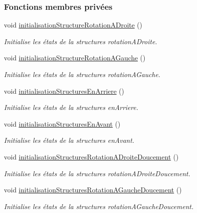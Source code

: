 \subsubsection*{Fonctions membres privées}
\begin{DoxyCompactItemize}
\item 
void \hyperlink{class_manette_a34e37141425dd6d62bcb5954312705c9}{initialisation\+Structure\+Rotation\+A\+Droite} ()
\begin{DoxyCompactList}\small\item\em Initialise les états de la structures rotation\+A\+Droite. \end{DoxyCompactList}\item 
void \hyperlink{class_manette_a9c1348e7b4c4cc071c9b8bac79f0eeab}{initialisation\+Structure\+Rotation\+A\+Gauche} ()
\begin{DoxyCompactList}\small\item\em Initialise les états de la structures rotation\+A\+Gauche. \end{DoxyCompactList}\item 
void \hyperlink{class_manette_ae4379b4f09192b83219de5aaa548fda0}{initialisation\+Structures\+En\+Arriere} ()
\begin{DoxyCompactList}\small\item\em Initialise les états de la structures en\+Arriere. \end{DoxyCompactList}\item 
void \hyperlink{class_manette_afd5504555886e0abf89347b4f8d57fe0}{initialisation\+Structures\+En\+Avant} ()
\begin{DoxyCompactList}\small\item\em Initialise les états de la structures en\+Avant. \end{DoxyCompactList}\item 
void \hyperlink{class_manette_aba0348198bad2dff52fe71684d73c2df}{initialisation\+Structures\+Rotation\+A\+Droite\+Doucement} ()
\begin{DoxyCompactList}\small\item\em Initialise les états de la structures rotation\+A\+Droite\+Doucement. \end{DoxyCompactList}\item 
void \hyperlink{class_manette_a35242782669d6d2cf88f2b5dbd9b0b73}{initialisation\+Structures\+Rotation\+A\+Gauche\+Doucement} ()
\begin{DoxyCompactList}\small\item\em Initialise les états de la structures rotation\+A\+Gauche\+Doucement. \end{DoxyCompactList}\item 

\end{DoxyCompactItemize}
